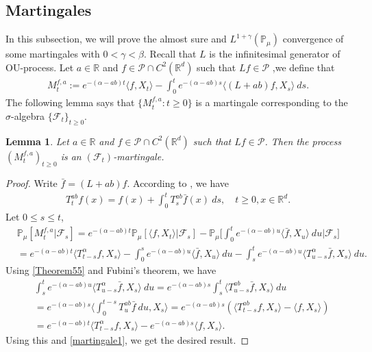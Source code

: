 \documentclass[12pt]{amsart}
\theoremstyle{plain}
\newtheorem{lem}[thm]{Lemma}
\theoremstyle{definition}
\numberwithin{equation}{section}
\begin{document}
\subsection{Martingales}
    In this subsection, we will prove the almost sure and $L^{1+\gamma}(\mathbb{P}_{\mu})$ convergence of some martingales with $0<\gamma<\beta$. Recall that $L$ is the infinitesimal generator of OU-process. Let $a\in \mathbb{R}$ and $f\in \mathcal{P}\cap C^2(\mathbb{R}^d)$ such that $Lf \in \mathcal{P}$ ,we define that
\begin{align}
\label{defmartingale}
    M_t^{f,a}:=e^{-(\alpha-ab)t}\langle f,X_t\rangle-\int_0^t e^{-(\alpha-ab)s}\langle (L+ab)f, X_s\rangle~ ds.
\end{align}
    The following lemma says that $\{M_t^{f,a}: t\geq 0\}$ is a martingale corresponding to the $\sigma$-algebra $\{\mathscr{F}_t\}_{t\geq 0}$.
\begin{lem}
\label{lemma25}
    Let $a\in \mathbb R$ and $f\in \mathcal{P}\cap C^2(\mathbb{R}^d)$ such that $Lf \in \mathcal{P}$. Then the process $(M_t^{f,a})_{t\geq 0}$ is an $(\mathscr F_t)$-martingale.
\end{lem}
\begin{proof}
    Write $\bar{f}=(L+ab)f$. According to \cite[Theorem A.55]{Li2011Measure-valued}, we have
\begin{align}\label{Theorem55}
    T_t^{ab}f(x)= f(x)+\int_0^t T_s^{ab}\bar{f}(x)~ds,\quad t\geq 0,x\in \mathbb{R}^d.
\end{align}
Let $0\leq s\leq t$,
\begin{align}
\label{martingale1}
    &\mathbb{P}_{\mu}[M_t^{f,a}|\mathscr{F}_s]
    =e^{-(\alpha-ab)t}\mathbb{P}_{\mu}\left[\langle f,X_t\rangle|\mathscr{F}_s\right]-\mathbb{P}_{\mu}\Big[\int_0^t e^{-(\alpha-ab)u}\langle \bar{f}, X_u\rangle~ du\Big|\mathscr{F}_s\big]
    \\&=e^{-(\alpha-ab)t}\langle T_{t-s}^{\alpha}f, X_s\rangle-\int_0^s e^{-(\alpha-ab)u}\langle \bar{f}, X_u\rangle~ du -\int_s^t e^{-(\alpha-ab)u}\langle T_{u-s}^{\alpha} \bar{f},X_s\rangle~ du.
\end{align}
    Using \eqref{Theorem55} and Fubini's theorem, we have
\begin{align}
    &\int_s^t e^{-(\alpha-ab)u}\langle T_{u-s}^{\alpha} \bar{f},X_s\rangle~ du=e^{-(\alpha-ab)s}\int_s^t\langle T_{u-s}^{ab}\bar{f},X_s\rangle~du\\
    &=e^{-(\alpha-ab)s}\Big\langle\int_0^{t-s}T_{u}^{ab}\bar{f}~du,X_s\Big\rangle=e^{-(\alpha-ab)s}\left(\langle T_{t-s}^{ab}f,X_s\rangle-\langle
    f,X_s\rangle\right)\\
    &=e^{-(\alpha-ab)t}\langle T_{t-s}^{\alpha}f, X_s\rangle-e^{-(\alpha-ab)s}\langle
    f,X_s\rangle.
\end{align}
   Using this and \eqref{martingale1}, we get the desired result.
\end{proof}
\end{document}

